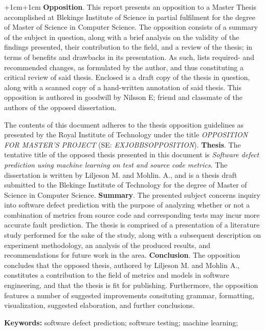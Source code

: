 
\abstract
\begin{changemargin}{+1cm}{+1cm}
\noindent
\textbf{Opposition}.
This report presents an opposition to a Master Thesis accomplished at Blekinge Institute of Science in partial fulfilment for the degree of Master of Science in Computer Science.
The opposition consists of a summary of the subject in question, along with a brief analysis on the validity of the findings presented, their contribution to the field, and a review of the thesis; in terms of benefits and drawbacks in its presentation.
As such, lists required- and recommended changes, as formulated by the author, and thus constituting a critical review of said thesis.
Enclosed is a draft copy of the thesis in question, along with a scanned copy of a hand-written annotation of said thesis.
This opposition is authored in goodwill by Nilsson E; friend and classmate of the authors of the opposed dissertation.

The contents of this document adheres to the thesis opposition guidelines as presented by the Royal Institute of Technology under the title \textit{OPPOSITION FOR MASTER'S PROJECT} (SE: \textit{EXJOBBSOPPOSITION}).
\newline
\textbf{Thesis}. The tentative title of the opposed thesis presented in this document is \textit{Software defect prediction using machine learning on test and source code metrics}.
The dissertation is written by Liljeson M. and Mohlin. A., and is a thesis draft submitted to the Blekinge Institute of Technology for the degree of Master of Science in Computer Science.
\newline
\textbf{Summary}.
The presented subject concerns inquiry into software defect prediction with the purpose of analyzing whether or not a combination of metrics from source code and corresponding tests may incur more accurate fault prediction.
The thesis is comprised of a presentation of a literature study performed for the sake of the study, along with a subsequent description on experiment methodology, an analysis of the produced results, and recommendations for future work in the area.
\newline
\textbf{Conclusion}.
The opposition concludes that the  opposed thesis, authored by Liljeson M. and Mohlin A., constitutes a contribution to the field of metrics and models in software engineering, and that the thesis is fit for publishing.
Furthermore, the opposition features a number of suggested improvements consituting grammar, formatting, visualization, suggested elaboration, and further conclusions.

\par\vspace {0.5cm}
\noindent
\textbf{Keywords:} software defect prediction; software testing; machine learning;

\end{changemargin}
